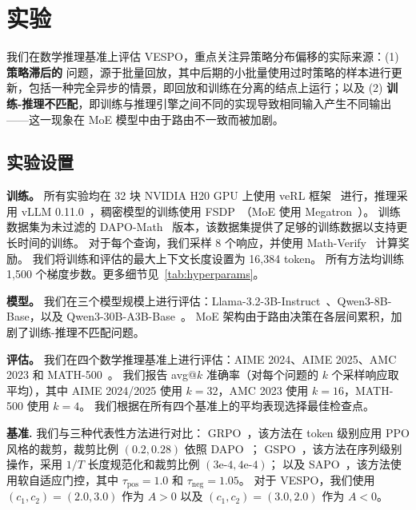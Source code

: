 \documentclass{article}
\theoremstyle{plain}
\theoremstyle{definition}
\theoremstyle{remark}
\begin{document}
\section{实验}
\label{sec:experiments}

我们在数学推理基准上评估 VESPO，重点关注异策略分布偏移的实际来源：(1) \textbf{策略滞后的} 问题，源于批量回放，其中后期的小批量使用过时策略的样本进行更新，包括一种完全异步的情景，即回放和训练在分离的结点上运行；以及 (2) \textbf{训练-推理不匹配}，即训练与推理引擎之间不同的实现导致相同输入产生不同输出——这一现象在 MoE 模型中由于路由不一致而被加剧。

\subsection{实验设置}
\label{sec:exp-setup}

\textbf{训练。}
所有实验均在 32 块 NVIDIA H20 GPU 上使用 veRL 框架~\citep{sheng2024hybridflow} 进行，推理采用 vLLM 0.11.0~\citep{kwon2023efficient}，稠密模型的训练使用 FSDP~\citep{zhao2023pytorch}（MoE 使用 Megatron~\citep{shoeybi2019megatron}）。
训练数据集为未过滤的 DAPO-Math~\citep{yu2025dapo} 版本，该数据集提供了足够的训练数据以支持更长时间的训练。
对于每个查询，我们采样 8 个响应，并使用 Math-Verify~\citep{mathverify2025} 计算奖励。
我们将训练和评估的最大上下文长度设置为 16,384 token。
所有方法均训练 1,500 个梯度步数。更多细节见~\cref{tab:hyperparams}。

\textbf{模型。}
我们在三个模型规模上进行评估：Llama-3.2-3B-Instruct~\citep{grattafiori2024llama3herdmodels}、Qwen3-8B-Base，以及 Qwen3-30B-A3B-Base~\citep{Yang2025Qwen3TR}。
MoE 架构由于路由决策在各层间累积，加剧了训练-推理不匹配问题。

\textbf{评估。}
我们在四个数学推理基准上进行评估：AIME 2024、AIME 2025、AMC 2023 和 MATH-500~\citep{hendrycks2021measuring}。
我们报告 avg@$k$ 准确率（对每个问题的 $k$ 个采样响应取平均），其中 AIME 2024/2025 使用 $k=32$，AMC 2023 使用 $k=16$，MATH-500 使用 $k=4$。
我们根据在所有四个基准上的平均表现选择最佳检查点。

\textbf{基准.}
我们与三种代表性方法进行对比：
{GRPO}~\citep{shao2024deepseekmath}，该方法在 token 级别应用 PPO 风格的裁剪，裁剪比例 $(0.2, 0.28)$ 依照 DAPO~\citep{yu2025dapo}；
{GSPO}~\citep{Zheng2025GroupSP}，该方法在序列级别操作，采用 $1/T$  长度规范化和裁剪比例 $(3\text{e-}4, 4\text{e-}4)$；
以及 {SAPO}~\citep{gao2025softadaptivepolicyoptimization}，该方法使用软自适应门控，其中 $\tau_{\text{pos}}=1.0$  和 $\tau_{\text{neg}}=1.05$。
对于 VESPO，我们使用 $(c_1, c_2) = (2.0, 3.0)$  作为 $A > 0$  以及 $(c_1, c_2) = (3.0, 2.0)$  作为 $A < 0$。
\end{document}
